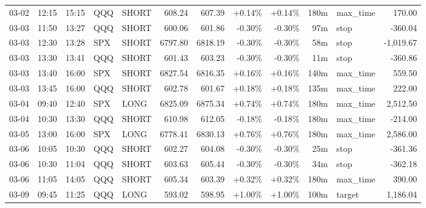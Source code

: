 \documentclass[11pt,a4paper,twoside]{article}
\begin{document}
\begin{center}
\begin{longtable}{>{\color{txtmain}}l l l l l r r r r r >{\color{txtmain}}l r}
03-02 & 12:15 & 15:15 & QQQ & SHORT & 608.24 & 607.39 & \textcolor{wingreen}{+0.14\%} & \textcolor{wingreen}{+0.14\%} & 180m & max\_time & \textcolor{wingreen}{170.00} \\
03-03 & 11:50 & 13:27 & QQQ & SHORT & 600.06 & 601.86 & \textcolor{lossred}{-0.30\%} & \textcolor{lossred}{-0.30\%} & 97m & stop & \textcolor{lossred}{-360.04} \\
03-03 & 12:30 & 13:28 & SPX & SHORT & 6797.80 & 6818.19 & \textcolor{lossred}{-0.30\%} & \textcolor{lossred}{-0.30\%} & 58m & stop & \textcolor{lossred}{-1,019.67} \\
03-03 & 13:30 & 13:41 & QQQ & SHORT & 601.43 & 603.23 & \textcolor{lossred}{-0.30\%} & \textcolor{lossred}{-0.30\%} & 11m & stop & \textcolor{lossred}{-360.86} \\
03-03 & 13:40 & 16:00 & SPX & SHORT & 6827.54 & 6816.35 & \textcolor{wingreen}{+0.16\%} & \textcolor{wingreen}{+0.16\%} & 140m & max\_time & \textcolor{wingreen}{559.50} \\
03-03 & 13:45 & 16:00 & QQQ & SHORT & 602.78 & 601.67 & \textcolor{wingreen}{+0.18\%} & \textcolor{wingreen}{+0.18\%} & 135m & max\_time & \textcolor{wingreen}{222.00} \\
03-04 & 09:40 & 12:40 & SPX & LONG & 6825.09 & 6875.34 & \textcolor{wingreen}{+0.74\%} & \textcolor{wingreen}{+0.74\%} & 180m & max\_time & \textcolor{wingreen}{2,512.50} \\
03-04 & 10:30 & 13:30 & QQQ & SHORT & 610.98 & 612.05 & \textcolor{lossred}{-0.18\%} & \textcolor{lossred}{-0.18\%} & 180m & max\_time & \textcolor{lossred}{-214.00} \\
03-05 & 13:00 & 16:00 & SPX & LONG & 6778.41 & 6830.13 & \textcolor{wingreen}{+0.76\%} & \textcolor{wingreen}{+0.76\%} & 180m & max\_time & \textcolor{wingreen}{2,586.00} \\
03-06 & 10:05 & 10:30 & QQQ & SHORT & 602.27 & 604.08 & \textcolor{lossred}{-0.30\%} & \textcolor{lossred}{-0.30\%} & 25m & stop & \textcolor{lossred}{-361.36} \\
03-06 & 10:30 & 11:04 & QQQ & SHORT & 603.63 & 605.44 & \textcolor{lossred}{-0.30\%} & \textcolor{lossred}{-0.30\%} & 34m & stop & \textcolor{lossred}{-362.18} \\
03-06 & 11:05 & 14:05 & QQQ & SHORT & 605.34 & 603.39 & \textcolor{wingreen}{+0.32\%} & \textcolor{wingreen}{+0.32\%} & 180m & max\_time & \textcolor{wingreen}{390.00} \\
03-09 & 09:45 & 11:25 & QQQ & LONG & 593.02 & 598.95 & \textcolor{wingreen}{+1.00\%} & \textcolor{wingreen}{+1.00\%} & 100m & target & \textcolor{wingreen}{1,186.04} \\

\end{longtable}
\end{center}
\end{document}
